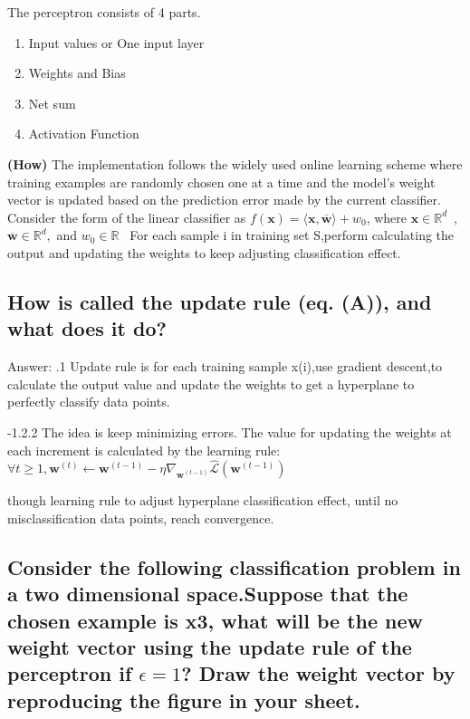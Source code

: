 \documentclass{article}
\begin{document}
The perceptron consists of 4 parts.
\begin{enumerate}
\item 	Input values or One input layer
\item 	Weights and Bias
\item 	Net sum
\item 	Activation Function
\end{enumerate}

\textbf{(How)} The implementation follows the widely used online learning scheme where training examples are randomly chosen one at a time and the model's weight vector is updated based on the prediction error made by the current classifier. Consider the form of the linear classifier as $f(\mathbf{x})=\langle\mathbf{x}, \overline{\boldsymbol{w}}\rangle+w_{0}$, where $\mathbf{x} \in \mathbb{R}^{d}$ , $\overline{\boldsymbol{w}} \in \mathbb{R}^{d},$ and $w_{0} \in \mathbb{R}$  For each sample i in training set S,perform calculating the output and updating the weights to keep adjusting classification effect.

 \subsection{\textbf{How is called the update rule (eq. (A)), and what does it do?}}
Answer:
\newline
{}.1 Update rule is for each training sample x(i),use gradient descent,to calculate the output value and update the weights to get a hyperplane to perfectly classify data points.

-1.2.2 The idea is keep minimizing errors. The value for updating the weights at each increment is calculated by the learning rule:
$\forall t \geq 1, \boldsymbol{w}^{(t)} \leftarrow \boldsymbol{w}^{(t-1)}-\eta \nabla_{\boldsymbol{w}^{(t-1)}} \hat{\mathcal{L}}\left(\boldsymbol{w}^{(t-1)}\right)$

though learning rule to adjust hyperplane classification effect, until no misclassification data points, reach convergence. 
 \subsection{\textbf{Consider the following classification problem in a two dimensional space.Suppose that the chosen example is x3, what will be the new weight vector using the update rule of the perceptron if $\epsilon=1$? Draw the weight vector by reproducing the figure in your sheet.\\}}
\end{document}
